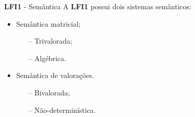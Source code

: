 \documentclass[table]{beamer}
\newcommand{\lfium}{{\normalfont\textbf{LFI1}}}
\begin{document}
    \begin{frame}{\lfium{} {-} Semântica}
        A \lfium{} possui dois sistemas semânticos:
        \begin{itemize}
            \item Semântica matricial;
            \begin{itemize}
                \item [--] Trivalorada;
                \item [--] Algébrica.
            \end{itemize}
            \item Semântica de valorações.
            \begin{itemize}
                \item [--] Bivalorada;
                \item [--] Não-determinística.
            \end{itemize}
        \end{itemize}
    \end{frame}
\end{document}
